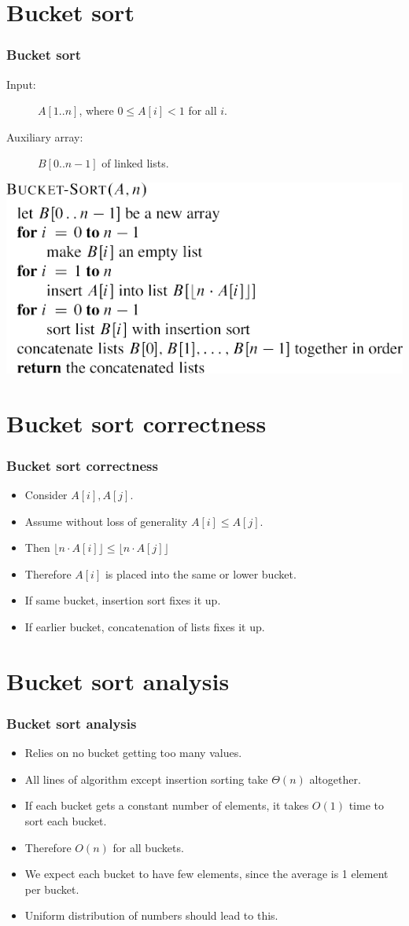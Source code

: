 \documentclass{beamer}
\newcommand{\bi}{\begin{itemize}}
\newcommand{\ei}{\end{itemize}}
\newcommand{\sect}[1]{
\section{#1}
\begin{frame}[fragile]\frametitle{#1}
}
\begin{document}
\sect{Bucket sort}

\begin{description}
\item[Input:] $A[1..n]$, where $0 \leq A[i] < 1$ for all $i$.
\item[Auxiliary array:] $B[0..n-1]$ of linked lists.
\end{description}
\vfill
\includegraphics{Bucket-Sort.pdf}
\end{frame}

\sect{Bucket sort correctness}

\bi
\item
  Consider $A[i], A[j]$.
\item
  Assume without loss of generality $A[i] \leq A[j]$.
\item
  Then $\lfloor n\cdot A[i]\rfloor \leq\lfloor n\cdot A[j]\rfloor$
\item
  Therefore $A[i]$ is placed into the same or lower bucket.
\item
  If same bucket, insertion sort fixes it up.
\item
  If earlier bucket, concatenation of lists fixes it up.
  \ei
  

\end{frame}

\sect{Bucket sort analysis}
\bi
\item Relies on no bucket getting too many values.
\item
  All lines of algorithm except insertion sorting take $\Theta(n)$ altogether.
\item
  If each bucket gets a constant number of elements, it takes $O(1)$
  time to sort each bucket.
\item
  Therefore  $O(n)$ for all buckets.
\item
  We expect each bucket to have few elements, since the average is 1
  element per bucket.
\item
  Uniform distribution of numbers should lead to this.
  \ei
\end{frame}
\end{document}
